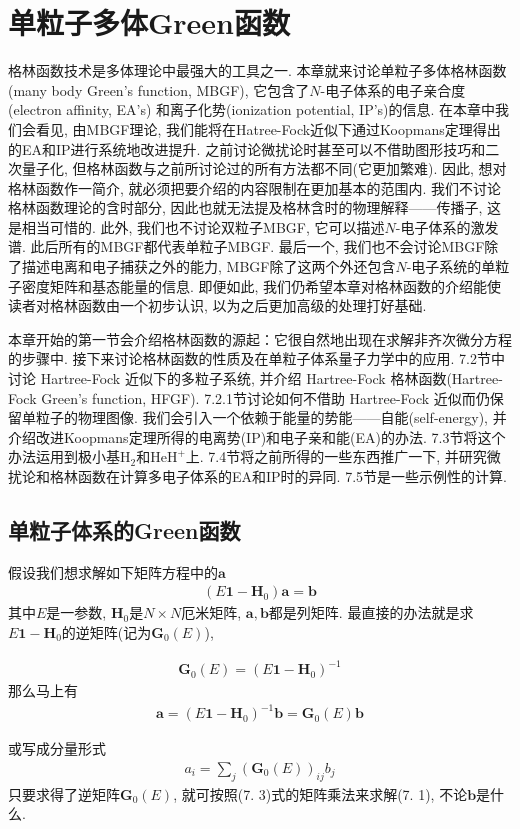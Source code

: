 \chapter{单粒子多体Green函数}
格林函数技术是多体理论中最强大的工具之一. 
本章就来讨论单粒子多体格林函数(many body Green's function, MBGF), 
它包含了$N$-电子体系的电子亲合度(electron affinity, EA's)
和离子化势(ionization potential, IP's)的信息. 
在本章中我们会看见, 
由MBGF理论, 
我们能将在Hatree-Fock近似下通过Koopmans定理得出的EA和IP进行系统地改进提升. 
之前讨论微扰论时甚至可以不借助图形技巧和二次量子化, 
但格林函数与之前所讨论过的所有方法都不同(它更加繁难). 
因此, 
想对格林函数作一简介, 
就必须把要介绍的内容限制在更加基本的范围内. 
我们不讨论格林函数理论的含时部分, 
因此也就无法提及格林含时的物理解释——传播子, 
这是相当可惜的. 
此外, 
我们也不讨论双粒子MBGF, 
它可以描述$N$-电子体系的激发谱. 
此后所有的MBGF都代表单粒子MBGF. 
最后一个, 
我们也不会讨论MBGF除了描述电离和电子捕获之外的能力, 
MBGF除了这两个外还包含$N$-电子系统的单粒子密度矩阵和基态能量的信息. 
即便如此, 
我们仍希望本章对格林函数的介绍能使读者对格林函数由一个初步认识, 
以为之后更加高级的处理打好基础.


本章开始的第一节会介绍格林函数的源起：它很自然地出现在求解非齐次微分方程的步骤中. 
接下来讨论格林函数的性质及在单粒子体系量子力学中的应用. 
7.2节中讨论 Hartree-Fock 近似下的多粒子系统, 
并介绍 Hartree-Fock 格林函数(Hartree-Fock Green's function, HFGF). 
7.2.1节讨论如何不借助 Hartree-Fock 近似而仍保留单粒子的物理图像. 
我们会引入一个依赖于能量的势能——自能(self-energy), 
并介绍改进Koopmans定理所得的电离势(IP)和电子亲和能(EA)的办法. 
7.3节将这个办法运用到极小基$\mathrm{H}_2$和$\mathrm{HeH}^+$上. 
7.4节将之前所得的一些东西推广一下, 
并研究微扰论和格林函数在计算多电子体系的EA和IP时的异同. 
7.5节是一些示例性的计算.

\section{单粒子体系的Green函数}
假设我们想求解如下矩阵方程中的$\mathbf{a}$
\begin{align}
(E\mathbf{1} - \mathbf{H}_0)\mathbf{a} = \mathbf{b}
\end{align}
其中$E$是一参数, 
$\mathbf{H}_0$是$N\times N$厄米矩阵, 
$\mathbf{a,b}$都是列矩阵. 
最直接的办法就是求$E\mathbf{1} - \mathbf{H}_0$的逆矩阵(记为$\mathbf{G}_0(E)$),

\begin{align}
\mathbf{G}_0(E) = (E\mathbf{1} - \mathbf{H}_0)^{-1}
\end{align}
那么马上有
\begin{align}
\mathbf{a} = (E\mathbf{1} - \mathbf{H}_0)^{-1}\mathbf{b} = \mathbf{G}_0(E)\mathbf{b}\tag{7.3a}
\end{align}
\addtocounter{equation}{1}
或写成分量形式
\begin{align}
a_i = \sum_j (\mathbf{G}_0(E))_{ij}b_j\tag{7.3b}
\end{align}
只要求得了逆矩阵$\mathbf{G}_0(E)$, 
就可按照(7.
3)式的矩阵乘法来求解(7.
1), 
不论$\mathbf{b}$是什么.

